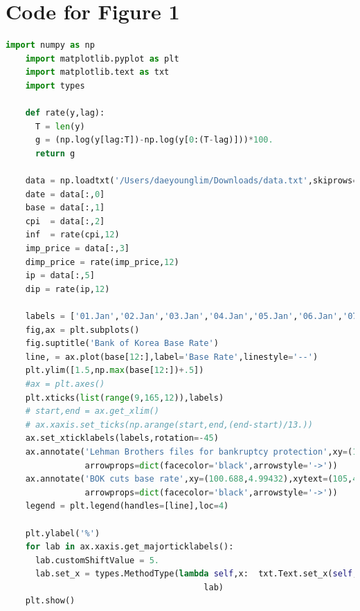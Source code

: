 \documentclass[answers]{exam}
\begin{document}
  \section{Code for Figure 1}
  \begin{lstlisting}[language=Python]
    import numpy as np
    import matplotlib.pyplot as plt
    import matplotlib.text as txt
    import types

    def rate(y,lag):
      T = len(y)
      g = (np.log(y[lag:T])-np.log(y[0:(T-lag)]))*100.
      return g

    data = np.loadtxt('/Users/daeyounglim/Downloads/data.txt',skiprows=1)
    date = data[:,0]
    base = data[:,1]
    cpi  = data[:,2]
    inf  = rate(cpi,12)
    imp_price = data[:,3]
    dimp_price = rate(imp_price,12)
    ip = data[:,5]
    dip = rate(ip,12)

    labels = ['01.Jan','02.Jan','03.Jan','04.Jan','05.Jan','06.Jan','07.Jan','08.Jan','09.Jan','10.Jan','11.Jan','12.Jan','13.Jan']
    fig,ax = plt.subplots()
    fig.suptitle('Bank of Korea Base Rate')
    line, = ax.plot(base[12:],label='Base Rate',linestyle='--')
    plt.ylim([1.5,np.max(base[12:])+.5])
    #ax = plt.axes()
    plt.xticks(list(range(9,165,12)),labels)
    # start,end = ax.get_xlim()
    # ax.xaxis.set_ticks(np.arange(start,end,(end-start)/13.))
    ax.set_xticklabels(labels,rotation=-45)
    ax.annotate('Lehman Brothers files for bankruptcy protection',xy=(100.441,5.21404),xytext=(105,5.5),
                arrowprops=dict(facecolor='black',arrowstyle='->'))
    ax.annotate('BOK cuts base rate',xy=(100.688,4.99432),xytext=(105,4.8),
                arrowprops=dict(facecolor='black',arrowstyle='->'))
    legend = plt.legend(handles=[line],loc=4)

    plt.ylabel('%')
    for lab in ax.xaxis.get_majorticklabels():
      lab.customShiftValue = 5.
      lab.set_x = types.MethodType(lambda self,x:  txt.Text.set_x(self, x+self.customShiftValue), 
                                        lab)
    plt.show()
  \end{lstlisting}
\end{document}
